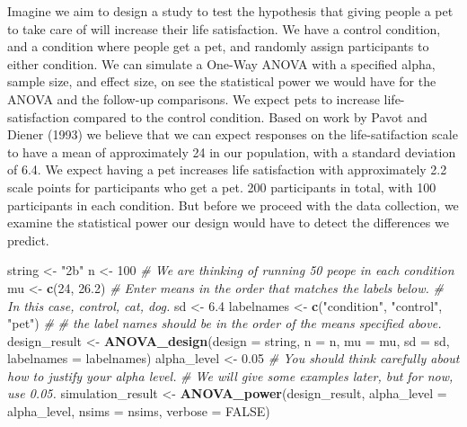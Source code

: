 \documentclass[]{book}
\newenvironment{Shaded}{\begin{snugshade}}{\end{snugshade}}
\newcommand{\CommentTok}[1]{\textcolor[rgb]{0.56,0.35,0.01}{\textit{#1}}}
\newcommand{\DataTypeTok}[1]{\textcolor[rgb]{0.13,0.29,0.53}{#1}}
\newcommand{\DecValTok}[1]{\textcolor[rgb]{0.00,0.00,0.81}{#1}}
\newcommand{\FloatTok}[1]{\textcolor[rgb]{0.00,0.00,0.81}{#1}}
\newcommand{\KeywordTok}[1]{\textcolor[rgb]{0.13,0.29,0.53}{\textbf{#1}}}
\newcommand{\NormalTok}[1]{#1}
\newcommand{\OtherTok}[1]{\textcolor[rgb]{0.56,0.35,0.01}{#1}}
\newcommand{\StringTok}[1]{\textcolor[rgb]{0.31,0.60,0.02}{#1}}
\begin{document}
Imagine we aim to design a study to test the hypothesis that giving people a pet to take care of will increase their life satisfaction. We have a control condition, and a condition where people get a pet, and randomly assign participants to either condition. We can simulate a One-Way ANOVA with a specified alpha, sample size, and effect size, on see the statistical power we would have for the ANOVA and the follow-up comparisons. We expect pets to increase life-satisfaction compared to the control condition. Based on work by Pavot and Diener (1993) we believe that we can expect responses on the life-satifaction scale to have a mean of approximately 24 in our population, with a standard deviation of 6.4. We expect having a pet increases life satisfaction with approximately 2.2 scale points for participants who get a pet. 200 participants in total, with 100 participants in each condition. But before we proceed with the data collection, we examine the statistical power our design would have to detect the differences we predict.

\begin{Shaded}
\begin{Highlighting}[]
\NormalTok{string <-}\StringTok{ "2b"}
\NormalTok{n <-}\StringTok{ }\DecValTok{100}
\CommentTok{# We are thinking of running 50 peope in each condition}
\NormalTok{mu <-}\StringTok{ }\KeywordTok{c}\NormalTok{(}\DecValTok{24}\NormalTok{, }\FloatTok{26.2}\NormalTok{)}
\CommentTok{# Enter means in the order that matches the labels below.}
\CommentTok{# In this case, control, cat, dog. }
\NormalTok{sd <-}\StringTok{ }\FloatTok{6.4}
\NormalTok{labelnames <-}\StringTok{ }\KeywordTok{c}\NormalTok{(}\StringTok{"condition"}\NormalTok{, }\StringTok{"control"}\NormalTok{, }\StringTok{"pet"}\NormalTok{) }\CommentTok{#}
\CommentTok{# the label names should be in the order of the means specified above.}
\NormalTok{design_result <-}\StringTok{ }\KeywordTok{ANOVA_design}\NormalTok{(}\DataTypeTok{design =}\NormalTok{ string,}
                   \DataTypeTok{n =}\NormalTok{ n, }
                   \DataTypeTok{mu =}\NormalTok{ mu, }
                   \DataTypeTok{sd =}\NormalTok{ sd, }
                   \DataTypeTok{labelnames =}\NormalTok{ labelnames)}
\NormalTok{alpha_level <-}\StringTok{ }\FloatTok{0.05}
\CommentTok{# You should think carefully about how to justify your alpha level.}
\CommentTok{# We will give some examples later, but for now, use 0.05.}
\NormalTok{simulation_result <-}\StringTok{ }\KeywordTok{ANOVA_power}\NormalTok{(design_result, }
                                 \DataTypeTok{alpha_level =}\NormalTok{ alpha_level, }
                                 \DataTypeTok{nsims =}\NormalTok{ nsims,}
                                 \DataTypeTok{verbose =} \OtherTok{FALSE}\NormalTok{)}
\end{Highlighting}
\end{Shaded}
\end{document}
